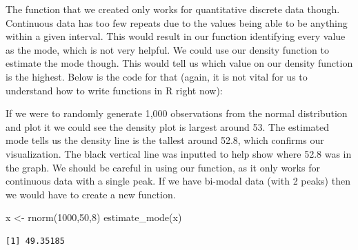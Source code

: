 \documentclass[
  letterpaper,
  DIV=11,
  numbers=noendperiod]{scrreprt}
\newenvironment{Shaded}{\begin{snugshade}}{\end{snugshade}}
\newcommand{\AttributeTok}[1]{\textcolor[rgb]{0.40,0.45,0.13}{#1}}
\newcommand{\ConstantTok}[1]{\textcolor[rgb]{0.56,0.35,0.01}{#1}}
\newcommand{\ControlFlowTok}[1]{\textcolor[rgb]{0.00,0.23,0.31}{\textbf{#1}}}
\newcommand{\DecValTok}[1]{\textcolor[rgb]{0.68,0.00,0.00}{#1}}
\newcommand{\FunctionTok}[1]{\textcolor[rgb]{0.28,0.35,0.67}{#1}}
\newcommand{\NormalTok}[1]{\textcolor[rgb]{0.00,0.23,0.31}{#1}}
\newcommand{\OtherTok}[1]{\textcolor[rgb]{0.00,0.23,0.31}{#1}}
\newcommand{\SpecialCharTok}[1]{\textcolor[rgb]{0.37,0.37,0.37}{#1}}
\begin{document}
The function that we created only works for quantitative discrete data
though. Continuous data has too few repeats due to the values being able
to be anything within a given interval. This would result in our
function identifying every value as the mode, which is not very helpful.
We could use our density function to estimate the mode though. This
would tell us which value on our density function is the highest. Below
is the code for that (again, it is not vital for us to understand how to
write functions in R right now):

\begin{Shaded}
\end{Shaded}

If we were to randomly generate 1,000 observations from the normal
distribution and plot it we could see the density plot is largest around
53. The estimated mode tells us the density line is the tallest around
52.8, which confirms our visualization. The black vertical line was
inputted to help show where 52.8 was in the graph. We should be careful
in using our function, as it only works for continuous data with a
single peak. If we have bi-modal data (with 2 peaks) then we would have
to create a new function.

\begin{Shaded}
\begin{Highlighting}[]
\NormalTok{x }\OtherTok{\textless{}{-}} \FunctionTok{rnorm}\NormalTok{(}\DecValTok{1000}\NormalTok{,}\DecValTok{50}\NormalTok{,}\DecValTok{8}\NormalTok{)}
\FunctionTok{estimate\_mode}\NormalTok{(x)}
\end{Highlighting}
\end{Shaded}

\begin{verbatim}
[1] 49.35185
\end{verbatim}
\end{document}

